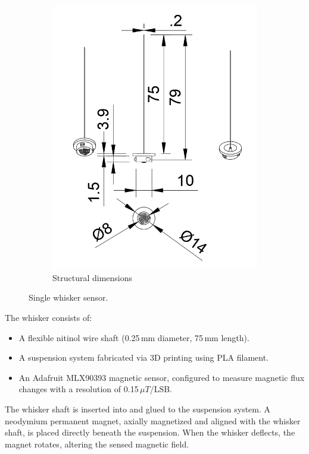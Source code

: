\begin{figure}[ht]
\begin{subfigure}[b]{0.31\textwidth}
        \includegraphics[width=\linewidth]{figures/whisker-dims}
        \caption{Structural dimensions} \label{fig:whisker-dims}
    \end{subfigure}
    \caption{Single whisker sensor.}
\end{figure}

The whisker consists of:
\begin{itemize}
    \item A flexible nitinol wire shaft (0.25\,mm diameter, 75\,mm length).
    \item A suspension system fabricated via 3D printing using PLA filament.
    \item An Adafruit MLX90393 magnetic sensor, configured to measure magnetic flux changes with a resolution of 0.15\,$\mu T$/LSB.
\end{itemize}

The whisker shaft is inserted into and glued to the suspension system.
A neodymium permanent magnet, axially magnetized and aligned with the whisker shaft, is placed directly beneath the suspension.
When the whisker deflects, the magnet rotates, altering the sensed magnetic field.

